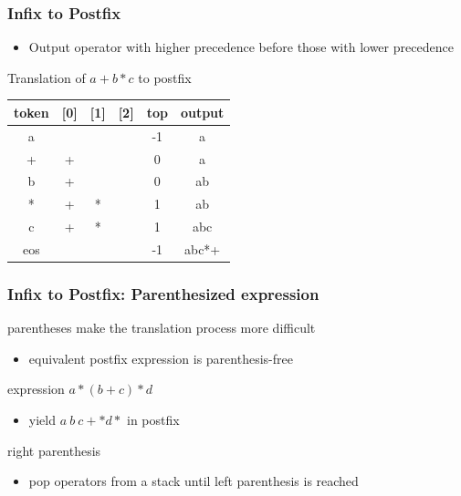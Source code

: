 \documentclass[newPxFont,sthlmFooter,nooffset]{beamer}
\begin{document}
\begin{frame}[t]
  \frametitle{Infix to Postfix}
  \begin{itemize}
  \item Output operator with higher precedence before those with lower precedence
  \end{itemize}

\bigskip
Translation of $a+b*c$ to postfix
  \begin{center}
    \begin{tabular}{c | c c c | c | c}
      token & [0] & [1] & [2] & top & output \\ \hline
      a &  &   &   & -1 & a \\
      + & + &  &  & 0 & a \\
      b & + & & & 0 & ab \\
      * & + & * & & 1 & ab \\
      c & + & * & & 1 & abc \\
      eos &  &  & & -1 & abc*+\\
    \end{tabular}
  \end{center}
\end{frame}

\begin{frame}[t]
  \frametitle{Infix to Postfix: Parenthesized expression}
parentheses make the translation process more difficult
\begin{itemize}
\item equivalent postfix expression is parenthesis-free
\end{itemize}

expression $a*(b+c)*d$
\begin{itemize}
\item yield $a~b~c+*d*$ in postfix
\end{itemize}

right parenthesis
\begin{itemize}
\item pop operators from a stack until left parenthesis is reached
\end{itemize}

\end{frame}
\end{document}
